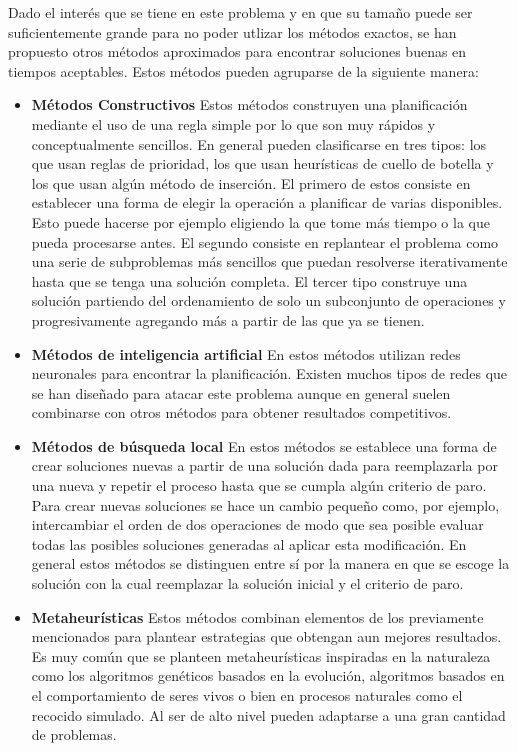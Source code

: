 Dado el interés que se tiene en este problema y en que su tamaño puede ser suficientemente grande para no poder utlizar los métodos exactos, se han propuesto otros métodos aproximados para encontrar soluciones buenas en tiempos aceptables. Estos métodos pueden agruparse de la siguiente manera\cite{Zhang2019}:
\begin{itemize}
\item \textbf{Métodos Constructivos} Estos métodos construyen una planificación mediante el uso de una regla simple por lo que son muy rápidos y conceptualmente sencillos. En general pueden clasificarse en tres tipos: los que usan reglas de prioridad, los que usan heurísticas de cuello de botella y los que usan algún método de inserción. El primero de estos consiste en establecer una forma de elegir la operación a planificar de varias disponibles. Esto puede hacerse por ejemplo eligiendo la que tome más tiempo o la que pueda procesarse antes. El segundo consiste en replantear el problema como una serie de subproblemas más sencillos que puedan resolverse iterativamente hasta que se tenga una solución completa. El tercer tipo construye una solución partiendo del ordenamiento de solo un subconjunto de operaciones y progresivamente agregando más a partir de las que ya se tienen.
\item \textbf{Métodos de inteligencia artificial} En estos métodos utilizan redes neuronales para encontrar la planificación. Existen muchos tipos de redes que se han diseñado para atacar este problema aunque en general suelen combinarse con otros métodos para obtener resultados competitivos.
\item \textbf{Métodos de búsqueda local} En estos métodos se establece una forma de crear soluciones nuevas a partir de una solución dada para reemplazarla por una nueva y repetir el proceso hasta que se cumpla algún criterio de paro. Para crear nuevas soluciones se hace un cambio pequeño como, por ejemplo, intercambiar el orden de dos operaciones de modo que sea posible evaluar todas las posibles soluciones generadas al aplicar esta modificación. En general estos métodos se distinguen entre sí por la manera en que se escoge la solución con la cual reemplazar la solución inicial y el criterio de paro.
\item \textbf{Metaheurísticas} Estos métodos combinan elementos de los previamente mencionados para plantear estrategias que obtengan aun mejores resultados. Es muy común que se planteen metaheurísticas inspiradas en la naturaleza como los algoritmos genéticos basados en la evolución, algoritmos basados en el comportamiento de seres vivos o bien en procesos naturales como el recocido simulado. Al ser de alto nivel pueden adaptarse a una gran cantidad de problemas.
\end{itemize}

